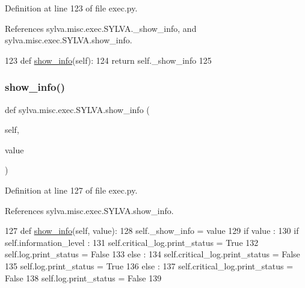 Definition at line 123 of file exec.\+py.



References sylva.\+misc.\+exec.\+S\+Y\+L\+V\+A.\+\_\+show\+\_\+info, and sylva.\+misc.\+exec.\+S\+Y\+L\+V\+A.\+show\+\_\+info.


\begin{DoxyCode}
123   \textcolor{keyword}{def }\hyperlink{namespacesylva_1_1misc_1_1exec_a887473109a0bd4665bac834e1a34eec0}{show\_info}(self):
124     \textcolor{keywordflow}{return} self.\_show\_info
125 
\end{DoxyCode}
\mbox{\label{classsylva_1_1misc_1_1exec_1_1_s_y_l_v_a_aa804346f551306b51131cb68194e8c71}} 
\subsubsection{\texorpdfstring{show\+\_\+info()}{show\_info()}\hspace{0.1cm}{\footnotesize\ttfamily [2/2]}}
{\footnotesize\ttfamily def sylva.\+misc.\+exec.\+S\+Y\+L\+V\+A.\+show\+\_\+info (\begin{DoxyParamCaption}\item[{}]{self,  }\item[{}]{value }\end{DoxyParamCaption})}



Definition at line 127 of file exec.\+py.



References sylva.\+misc.\+exec.\+S\+Y\+L\+V\+A.\+show\+\_\+info.


\begin{DoxyCode}
127   \textcolor{keyword}{def }\hyperlink{namespacesylva_1_1misc_1_1exec_a887473109a0bd4665bac834e1a34eec0}{show\_info}(self, value):
128     self.\_show\_info = value
129     \textcolor{keywordflow}{if} value :
130       \textcolor{keywordflow}{if} self.information\_level :
131         self.critical\_log.print\_status = \textcolor{keyword}{True}
132         self.log.print\_status = \textcolor{keyword}{False}
133       \textcolor{keywordflow}{else} :
134         self.critical\_log.print\_status = \textcolor{keyword}{False}
135         self.log.print\_status = \textcolor{keyword}{True}
136     \textcolor{keywordflow}{else} :
137       self.critical\_log.print\_status = \textcolor{keyword}{False}
138       self.log.print\_status = \textcolor{keyword}{False}
139 
\end{DoxyCode}
\mbox{\label{classsylva_1_1misc_1_1exec_1_1_s_y_l_v_a_aa97ba1b0b460019562d0b822f1c10398}} 

